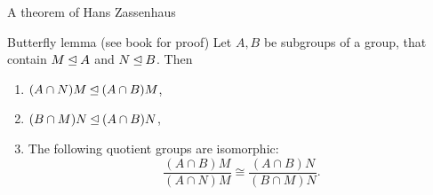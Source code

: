 \documentclass[8pt, handout]{beamer}
\begin{document}
\begin{frame}{A theorem of Hans Zassenhaus} 

  \begin{block}{Butterfly lemma (see book for proof)}
    Let $A,B$ be subgroups of a group, that contain $M\unlhd A$ and
    $N\unlhd B$. Then
    \begin{enumerate}
    \item $(A\cap N)M\unlhd (A\cap B)M$,
    \item $(B\cap M)N\unlhd (A\cap B)N$,
    \item The following quotient groups are isomorphic:
      \[
      \frac{(A\cap B)M}{(A\cap N)M}\cong\frac{(A\cap B)N}{(B\cap M)N}.
      \]
    \end{enumerate}
  \end{block}

  \vspace{-2mm}\pause
  

\end{frame}
\end{document}
